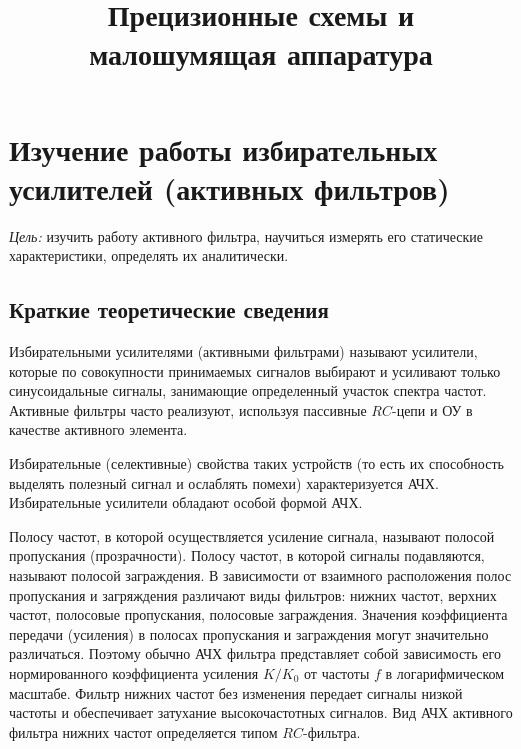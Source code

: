 \documentclass[a4paper,12pt]{article}
\title{Прецизионные схемы и малошумящая аппаратура}
\author{}
\begin{document}

\section{Изучение работы избирательных усилителей (активных фильтров)}

{\it Цель:} изучить работу активного фильтра, научиться измерять его статические характеристики, определять их аналитически.
 
\subsection{Краткие теоретические сведения}

Избирательными усилителями (активными фильтрами) называют усилители, которые по совокупности принимаемых сигналов
выбирают и усиливают только синусоидальные сигналы, занимающие определенный участок спектра частот.
Активные фильтры часто реализуют, используя пассивные $RC$-цепи и ОУ в качестве активного элемента.

Избирательные (селективные) свойства таких устройств (то есть их способность выделять полезный сигнал и ослаблять помехи)
характеризуется АЧХ. Избирательные усилители обладают особой формой АЧХ.

Полосу частот, в которой осуществляется усиление сигнала, называют полосой пропускания (прозрачности). Полосу частот,
в которой сигналы подавляются, называют полосой заграждения. В зависимости от взаимного расположения полос
пропускания и загряждения различают виды фильтров: нижних частот, верхних частот, полосовые пропускания,
полосовые заграждения. Значения коэффициента передачи (усиления) в полосах пропускания и заграждения 
могут значительно различаться. Поэтому обычно АЧХ фильтра представляет собой зависимость его нормированного 
коэффициента усиления $K/K_{0}$ от частоты $f$ в логарифмическом масштабе. Фильтр нижних частот без изменения
передает сигналы низкой частоты и обеспечивает затухание высокочастотных сигналов. Вид АЧХ активного фильтра 
нижних частот определяется типом $RC$-фильтра.
\end{document}
